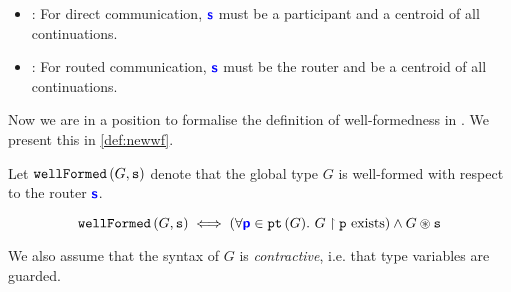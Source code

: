 \begin{itemize}
\item 
{}:
For direct communication, ${\color{blue}\bm{\mathsf{s}}}$ must
be a participant and a centroid of all continuations.

\item 
{}:
For routed communication, ${\color{blue}\bm{\mathsf{s}}}$ must
be the router and be a centroid of all continuations.

\end{itemize}

Now we are in a position to formalise the definition
of well-formedness in \newtheory. We present this in
\cref{def:newwf}.

\begin{definition}
Let $\textnormal{\texttt{wellFormed}}\left(G, {\mathtt{s}}\right)$ 
denote that the global type $G$
is well-formed with respect to the router ${\color{blue}\bm{\mathsf{s}}}$.

\[
\textnormal{\texttt{wellFormed}}\left(G, {\mathtt{s}}\right) \iff 
(\forall {\color{blue}\bm{\mathsf{p}}} \in {\textnormal{\texttt{pt}}\left({G}\right)}. ~ {G} \upharpoonright {\mathtt{p}} \text{ exists})
\wedge
{G} \circledast {\mathtt{s}}
\]

We also assume that the syntax of $G$ is \textit{contractive}, 
i.e. that type variables are guarded.

\label{def:newwf}
\end{definition}